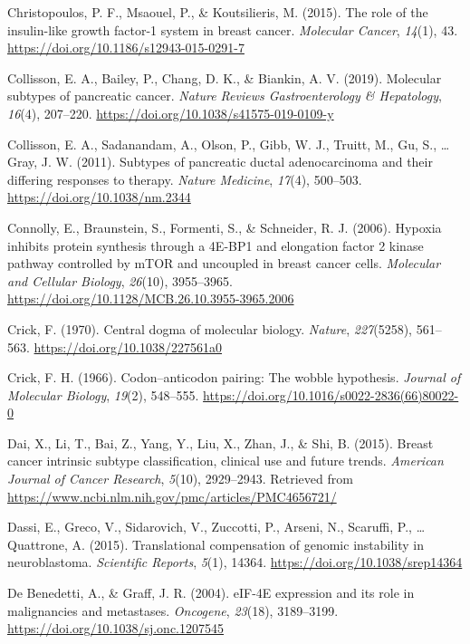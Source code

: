 \documentclass[12pt,openany]{book}
\begin{document}
\hypertarget{ref-Christopoulos2015}{}
Christopoulos, P. F., Msaouel, P., \& Koutsilieris, M. (2015). The role
of the insulin-like growth factor-1 system in breast cancer.
\emph{Molecular Cancer}, \emph{14}(1), 43.
\url{https://doi.org/10.1186/s12943-015-0291-7}

\hypertarget{ref-Collisson2019}{}
Collisson, E. A., Bailey, P., Chang, D. K., \& Biankin, A. V. (2019).
Molecular subtypes of pancreatic cancer. \emph{Nature Reviews
Gastroenterology \& Hepatology}, \emph{16}(4), 207--220.
\url{https://doi.org/10.1038/s41575-019-0109-y}

\hypertarget{ref-Collisson2011}{}
Collisson, E. A., Sadanandam, A., Olson, P., Gibb, W. J., Truitt, M.,
Gu, S., \ldots{} Gray, J. W. (2011). Subtypes of pancreatic ductal
adenocarcinoma and their differing responses to therapy. \emph{Nature
Medicine}, \emph{17}(4), 500--503. \url{https://doi.org/10.1038/nm.2344}

\hypertarget{ref-Connolly2006}{}
Connolly, E., Braunstein, S., Formenti, S., \& Schneider, R. J. (2006).
Hypoxia inhibits protein synthesis through a 4E-BP1 and elongation
factor 2 kinase pathway controlled by mTOR and uncoupled in breast
cancer cells. \emph{Molecular and Cellular Biology}, \emph{26}(10),
3955--3965. \url{https://doi.org/10.1128/MCB.26.10.3955-3965.2006}

\hypertarget{ref-Crick1970}{}
Crick, F. (1970). Central dogma of molecular biology. \emph{Nature},
\emph{227}(5258), 561--563. \url{https://doi.org/10.1038/227561a0}

\hypertarget{ref-Crick1966}{}
Crick, F. H. (1966). Codon--anticodon pairing: The wobble hypothesis.
\emph{Journal of Molecular Biology}, \emph{19}(2), 548--555.
\url{https://doi.org/10.1016/s0022-2836(66)80022-0}

\hypertarget{ref-Dai2015}{}
Dai, X., Li, T., Bai, Z., Yang, Y., Liu, X., Zhan, J., \& Shi, B.
(2015). Breast cancer intrinsic subtype classification, clinical use and
future trends. \emph{American Journal of Cancer Research}, \emph{5}(10),
2929--2943. Retrieved from
\url{https://www.ncbi.nlm.nih.gov/pmc/articles/PMC4656721/}

\hypertarget{ref-Dassi2015}{}
Dassi, E., Greco, V., Sidarovich, V., Zuccotti, P., Arseni, N.,
Scaruffi, P., \ldots{} Quattrone, A. (2015). Translational compensation
of genomic instability in neuroblastoma. \emph{Scientific Reports},
\emph{5}(1), 14364. \url{https://doi.org/10.1038/srep14364}

\hypertarget{ref-DeBenedetti2004}{}
De Benedetti, A., \& Graff, J. R. (2004). eIF-4E expression and its role
in malignancies and metastases. \emph{Oncogene}, \emph{23}(18),
3189--3199. \url{https://doi.org/10.1038/sj.onc.1207545}
\end{document}
